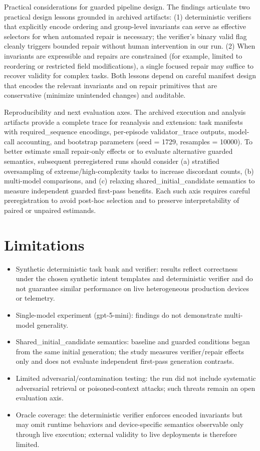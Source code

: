 \documentclass[conference]{IEEEtran}
\begin{document}
Practical considerations for guarded pipeline design. The findings articulate two practical design lessons grounded in archived artifacts: (1) deterministic verifiers that explicitly encode ordering and group-level invariants can serve as effective selectors for when automated repair is necessary; the verifier's binary valid flag cleanly triggers bounded repair without human intervention in our run. (2) When invariants are expressible and repairs are constrained (for example, limited to reordering or restricted field modifications), a single focused repair may suffice to recover validity for complex tasks. Both lessons depend on careful manifest design that encodes the relevant invariants and on repair primitives that are conservative (minimize unintended changes) and auditable.

Reproducibility and next evaluation axes. The archived execution and analysis artifacts provide a complete trace for reanalysis and extension: task manifests with required\_sequence encodings, per-episode validator\_trace outputs, model-call accounting, and bootstrap parameters (seed = 1729, resamples = 10000). To better estimate small repair-only effects or to evaluate alternative guarded semantics, subsequent preregistered runs should consider (a) stratified oversampling of extreme/high-complexity tasks to increase discordant counts, (b) multi-model comparisons, and (c) relaxing shared\_initial\_candidate semantics to measure independent guarded first-pass benefits. Each such axis requires careful preregistration to avoid post-hoc selection and to preserve interpretability of paired or unpaired estimands.

\section{Limitations}
\begin{itemize}
\item Synthetic deterministic task bank and verifier: results reflect correctness under the chosen synthetic intent templates and deterministic verifier and do not guarantee similar performance on live heterogeneous production devices or telemetry.
\item Single-model experiment (gpt-5-mini): findings do not demonstrate multi-model generality.
\item Shared\_initial\_candidate semantics: baseline and guarded conditions began from the same initial generation; the study measures verifier/repair effects only and does not evaluate independent first-pass generation contrasts.
\item Limited adversarial/contamination testing: the run did not include systematic adversarial retrieval or poisoned-context attacks; such threats remain an open evaluation axis.
\item Oracle coverage: the deterministic verifier enforces encoded invariants but may omit runtime behaviors and device-specific semantics observable only through live execution; external validity to live deployments is therefore limited.
\end{itemize}
\end{document}
